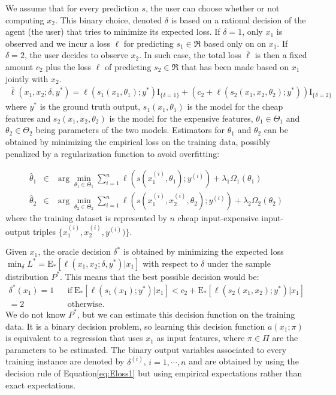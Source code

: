 \documentclass{article}
\newcommand{\x}{x}
\newcommand{\y}{y}
\newcommand{\s}{s}
\renewcommand{\c}{c}
\newcommand{\proba}{P}
\newcommand{\loss}{\ell}
\newcommand{\indic}{\textrm{I}}
\newcommand{\Expectation}[2]{\textrm{E}_{#1}{\left[#2\right]}}
\begin{document}
We assume that for every prediction $s$, the user can choose whether or not
computing $\x_2$. This binary choice, denoted $\delta$ is based on a rational decision of the agent (the user) that tries to minimize its expected loss.
If $\delta=1$, only $x_1$ is observed and we incur a loss $\loss$ for predicting $s_1\in\Re$ based only on on $\x_1$. 
If $\delta=2$, the user decides to observe $\x_2$. In such case,
the total loss $\bar\loss$ is then a fixed amount $\c_2$ plus the loss $\loss$ of 
predicting $s_2\in\Re$ that has been made based on $\x_1$ jointly with $x_2$.
\begin{eqnarray}
\bar\loss(x_1,x_2;\delta,\y^*) = 
\loss(s_1(\x_1,\theta_1);\y^*) \indic_{\{\delta=1\}}
+ \left(
c_2 +\loss(s_2(\x_1,\x_2,\theta_2);y^*) 
\right)
\indic_{\{\delta=2\}} 
\label{eq:loss}
\end{eqnarray}
where $y^*$ is the ground truth output, $s_1(\x_1,\theta_1)$ is the model for the cheap features and $s_2(\x_1,\x_2,\theta_2)$ is the model for the expensive features, $\theta_1\in\Theta_1$ and $\theta_2\in\Theta_2$ being parameters of the two models. Estimators for $\theta_1$ and $\theta_2$ can be obtained by minimizing the empirical loss on the training data, possibly penalized by a regularization function to avoid overfitting:

\begin{eqnarray}
\hat\theta_1 &\in & \arg\min_{\theta_1\in\Theta_1} \sum_{i=1}^n \loss(s(x_1^{(i)},\theta_1);\y^{(i)}) + \lambda_1 \Omega_1(\theta_1)
\label{eq:Theta1}
\\
\hat\theta_2 &\in & \arg\min_{\theta_2\in\Theta_2} \sum_{i=1}^n \loss(s(\x_1^{(i)},x_2^{(i)},\theta_2);\y^{(i)}) + \lambda_2 \Omega_2(\theta_2)
\label{eq:Theta2}
\end{eqnarray}
where the training dataset is represented by $n$ cheap input-expensive input-output triples $\{\x_1^{(i)},\x_2^{(i)},\y^{(i)})\}$.

Given $x_1$, the oracle decision $\delta^*$ is obtained by minimizing the expected loss $\min_\delta L^*=\Expectation{*}{\loss(\x_1,\x_2;\delta,\y^*)|\x_1}$ with respect to $\delta$ under the sample distribution $\proba^*$. This means that the best possible decision would be:
\begin{eqnarray}
\delta^*(x_1) = 1 && \mathrm{if}\  \Expectation{*}{\loss(s_1(\x_1);\y^*)|\x_1}<
c_2 + \Expectation{*}{\loss(\s_2(\x_1,\x_2);y^*)|\x_1}
\nonumber\\
=2&&\mathrm{otherwise.}
\label{eq:Eloss1}
\end{eqnarray}
We do not know $\proba^*$, but we can estimate this decision function 
on the training data.  It is a binary decision problem, so learning this decision function $a(\x_1;\pi)$ is equivalent to a regression that uses $x_1$ as input features, where $\pi\in\Pi$ are the parameters to be estimated. The binary output variables associated to every training instance are denoted by $\delta^{(i)}$, $i=1,\cdots, n$ and are obtained by using the decision rule of Equation\eqref{eq:Eloss1} but using empirical expectations rather than exact expectations.
\end{document}
